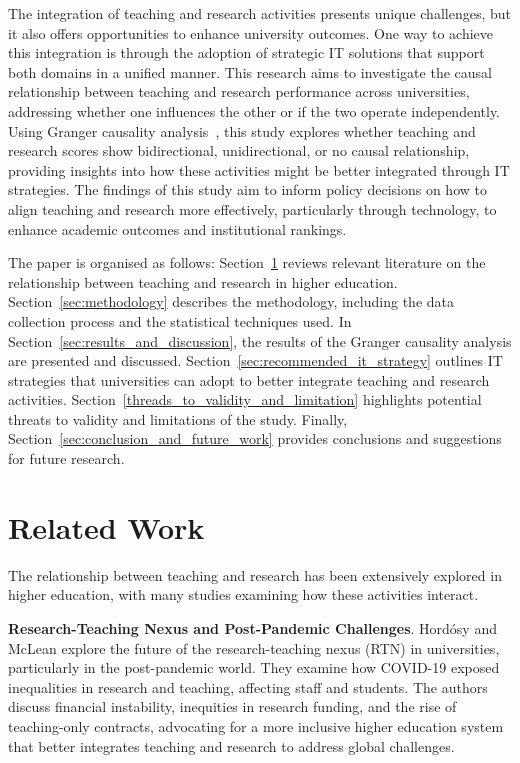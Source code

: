 \documentclass[conference]{IEEEtran}
\begin{document}
The integration of teaching and research activities presents unique challenges, but it also offers opportunities to enhance university outcomes. One way to achieve this integration is through the adoption of strategic IT solutions that support both domains in a unified manner. This research aims to investigate the causal relationship between teaching and research performance across universities, addressing whether one influences the other or if the two operate independently. Using Granger causality analysis~\cite{granger1969investigating}, this study explores whether teaching and research scores show bidirectional, unidirectional, or no causal relationship, providing insights into how these activities might be better integrated through IT strategies. The findings of this study aim to inform policy decisions on how to align teaching and research more effectively, particularly through technology, to enhance academic outcomes and institutional rankings.

The paper is organised as follows: Section~\ref{sec:related_work} reviews relevant literature on the relationship between teaching and research in higher education. Section~\ref{sec:methodology} describes the methodology, including the data collection process and the statistical techniques used. In Section~\ref{sec:results_and_discussion}, the results of the Granger causality analysis are presented and discussed. Section~\ref{sec:recommended_it_strategy} outlines IT strategies that universities can adopt to better integrate teaching and research activities. Section~\ref{threads_to_validity_and_limitation} highlights potential threats to validity and limitations of the study. Finally, Section~\ref{sec:conclusion_and_future_work} provides conclusions and suggestions for future research.

\section{Related Work} \label{sec:related_work}  
The relationship between teaching and research has been extensively explored in higher education, with many studies examining how these activities interact. 

\textbf{Research-Teaching Nexus and Post-Pandemic Challenges}. Hordósy and McLean \cite{hordosy2022future} explore the future of the research-teaching nexus (RTN) in universities, particularly in the post-pandemic world. They examine how COVID-19 exposed inequalities in research and teaching, affecting staff and students. The authors discuss financial instability, inequities in research funding, and the rise of teaching-only contracts, advocating for a more inclusive higher education system that better integrates teaching and research to address global challenges.  
\end{document}

